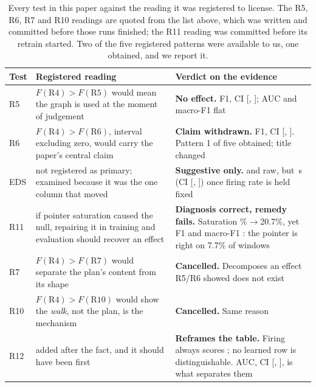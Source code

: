 \documentclass[10pt,twocolumn]{article}
\begin{document}
\begin{table}[t]
\centering\small
\setlength{\tabcolsep}{3.5pt}
\begin{tabular}{@{}p{}p{}p{}@{}}
\toprule
Test & Registered reading & Verdict on the evidence \\
\midrule
R5 &
$F(\text{R4}){>}F(\text{R5})$ would mean the graph is used at the moment of
judgement &
\textbf{No effect.} \ngDelta{} F1, CI [\ngDeltaLo{}, \ngDeltaHi{}]; AUC and
macro-F1 flat \\[2pt]
R6 &
$F(\text{R4}){>}F(\text{R6})$, interval excluding zero, would carry the
paper's central claim &
\textbf{Claim withdrawn.} \ntDelta{} F1, CI [\ntDeltaLo{}, \ntDeltaHi{}].
Pattern 1 of five obtained; title changed \\[2pt]
EDS &
not registered as primary; examined because it was the one column that moved &
\textbf{Suggestive only.} \ngEdsDelta{} and \ntEdsDelta{} raw, but
\moMed{}\,s (CI [\moLo{}, \moHi{}]) once firing rate is held fixed \\[2pt]
R11 &
if pointer saturation caused the null, repairing it in training and evaluation
should recover an effect &
\textbf{Diagnosis correct, remedy fails.} Saturation \satPct{}\%$\to$20.7\%,
yet F1 \fxF{} and macro-F1 \fxMacroDelta{}: the pointer is right on 7.7\% of
windows \\[2pt]
R7 &
$F(\text{R4}){>}F(\text{R7})$ would separate the plan's content from its shape &
\textbf{Cancelled.} Decomposes an effect R5/R6 showed does not exist \\[2pt]
R10 &
$F(\text{R4}){>}F(\text{R10})$ would show the \emph{walk}, not the plan, is the
mechanism &
\textbf{Cancelled.} Same reason \\[2pt]
R12 &
added after the fact, and it should have been first &
\textbf{Reframes the table.} Firing always scores \afF{}; no learned row is
distinguishable. AUC, \afAucDelta{} CI [\afAucLo{}, \afAucHi{}], is what
separates them \\
\bottomrule
\end{tabular}
\caption{Every test in this paper against the reading it was registered to
license. The R5, R6, R7 and R10 readings are quoted from the list above, which
was written and committed before those runs finished; the R11 reading was
committed before its retrain started. Two of the five registered patterns were
available to us, one obtained, and we report it.}
\label{tab:verdict}
\end{table}
\end{document}
